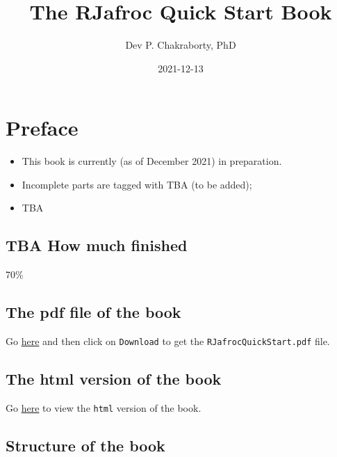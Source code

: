 \documentclass[
]{book}
\title{The RJafroc Quick Start Book}
\author{Dev P. Chakraborty, PhD}
\date{2021-12-13}
\providecommand{\tightlist}{%
  \setlength{\itemsep}{0pt}\setlength{\parskip}{0pt}}
\begin{document}
\maketitle

{
\setcounter{tocdepth}{1}
\tableofcontents
}
\hypertarget{preface}{%
\chapter*{Preface}\label{preface}}

\begin{itemize}
\tightlist
\item
  This book is currently (as of December 2021) in preparation.
\item
  Incomplete parts are tagged with TBA (to be added);\\
\item
  TBA
\end{itemize}

\hypertarget{tba-how-much-finished}{%
\section*{TBA How much finished}\label{tba-how-much-finished}}

70\%

\hypertarget{the-pdf-file-of-the-book}{%
\section*{The pdf file of the book}\label{the-pdf-file-of-the-book}}

Go \href{https://github.com/dpc10ster/RJafrocQuickStart/blob/gh-pages/RJafrocQuickStart.pdf}{here} and then click on \texttt{Download} to get the \texttt{RJafrocQuickStart.pdf} file.

\hypertarget{the-html-version-of-the-book}{%
\section*{The html version of the book}\label{the-html-version-of-the-book}}

Go \href{https://dpc10ster.github.io/RJafrocQuickStart/}{here} to view the \texttt{html} version of the book.

\hypertarget{structure-of-the-book}{%
\section*{Structure of the book}\label{structure-of-the-book}}
\end{document}
